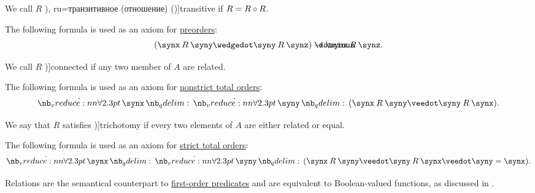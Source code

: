 \begin{definition}
\begin{thmenum}[resume=def:binary_relation]
     We call \( R \) \term[bg=транзитивна (релация) (\cite[369]{ГеновМиховскиМоллов1991Алгебра}), ru=транзитивное (отношение) (\cite[def. 2.7]{Гуров2013ТеорияРешёток})]{transitive} if \( R = R \bincirc R \).

    The following formula is used as an axiom for \hyperref[def:partially_ordered_set]{preorders}:
    \begin{equation}\label{eq:def:binary_relation/transitive}
      (\synx \mathbin{R} \syny \synwedge \syny \mathbin{R} \synz) \synimplies \synx \mathbin{R} \synz.
    \end{equation}

     We call \( R \) \term[ru=полное (отношение) (\cite[def. 2.7]{Гуров2013ТеорияРешёток})]{connected} if any two member of \( A \) are related.

    The following formula is used as an axiom for \hyperref[def:totally_ordered_set]{nonstrict total orders}:
    \begin{equation}\label{eq:def:binary_relation/connected}
      \qforall \synx \qforall \syny (\synx \mathbin{R} \syny \synvee \syny \mathbin{R} \synx).
    \end{equation}

     We say that \( R \) satisfies \term[bg=трихотомия (\cite[11]{Тагамлицки1971ДиференциалноСмятане})]{trichotomy} if every two elements of \( A \) are either related or equal.

    The following formula is used as an axiom for \hyperref[def:totally_ordered_set]{strict total orders}:
    \begin{equation}\label{eq:def:binary_relation/trichotomy}
      \qforall \synx \qforall \syny (\synx \mathbin{R} \syny \synvee \syny \mathbin{R} \synx \synvee \syny = \synx).
    \end{equation}
  \end{thmenum}
\end{definition}
\begin{comments}
  \item Relations are the semantical counterpart to \hyperref[def:first_order_structure/interpretation/predicate]{first-order predicates} and are equivalent to Boolean-valued functions, as discussed in .
\end{comments}

